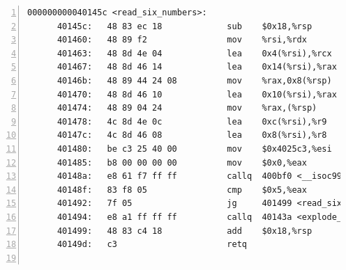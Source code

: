 \documentclass{article}
\begin{document}
\begin{lstlisting}[title = bomb的反汇编代码及部分注释, xleftmargin = 2em,xrightmargin = 2em, aboveskip = 1em, numbers = left, basicstyle=\scriptsize\ttfamily, numberstyle=\scriptsize]
    000000000040145c <read_six_numbers>:
      40145c:	48 83 ec 18          	sub    $0x18,%rsp						; %rsp -= 0x18;
      401460:	48 89 f2             	mov    %rsi,%rdx						; %rdx = %rsi;
      401463:	48 8d 4e 04          	lea    0x4(%rsi),%rcx					; %rcx = %rsi + 0x4;
      401467:	48 8d 46 14          	lea    0x14(%rsi),%rax					; %rax = %rsi + 0x14;
      40146b:	48 89 44 24 08       	mov    %rax,0x8(%rsp)					; M[%rsp + 0x8] = %rax;
      401470:	48 8d 46 10          	lea    0x10(%rsi),%rax					; %rax = %rsi + 0x10;
      401474:	48 89 04 24          	mov    %rax,(%rsp)						; M[%rsp] = %rax;
      401478:	4c 8d 4e 0c          	lea    0xc(%rsi),%r9					; %r9 = %rsi + 0xc;
      40147c:	4c 8d 46 08          	lea    0x8(%rsi),%r8					; %r8 = %rsi + 0x8;
      401480:	be c3 25 40 00       	mov    $0x4025c3,%esi					; %esi = 0x4025c3;
      401485:	b8 00 00 00 00       	mov    $0x0,%eax						; %eax = 0;
      40148a:	e8 61 f7 ff ff       	callq  400bf0 <__isoc99_sscanf@plt>		; sscanf(...);
      40148f:	83 f8 05             	cmp    $0x5,%eax						; if (%eax > 5)
      401492:	7f 05                	jg     401499 <read_six_numbers+0x3d>	;	  goto #820;
      401494:	e8 a1 ff ff ff       	callq  40143a <explode_bomb>			; explode_bomb(...);
      401499:	48 83 c4 18          	add    $0x18,%rsp						; %rsp += 0x18;
      40149d:	c3                   	retq									; return;
    

\end{lstlisting}
\end{document}
